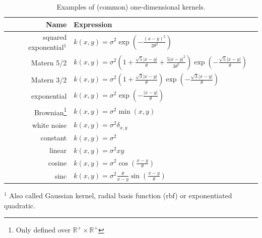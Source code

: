 \documentclass[twoside,openright]{report}
\begin{document}
\begin{table}[b]
\begin{center}
\begin{tabular}{|rlN|}
		\hline
		Name & Expression &\\[4mm]  \hline 
		squared exponential$^1$ & $\displaystyle k(x,y) = \sigma^2 \exp \left(- \frac{(x-y)^2}{2 \theta^2} \right)$ &\\[6mm]
		Matern 5/2 & $\displaystyle k(x,y) = \sigma^2 \left(1 + \frac{\sqrt{5}|x-y|}{\theta} + \frac{5|x-y|^2}{3 \theta^2} \right) \exp \left(- \frac{\sqrt{5}|x-y|}{\theta} \right)$ &\\[6mm]
		Matern 3/2 & $\displaystyle k(x,y) = \sigma^2 \left(1 + \frac{\sqrt{3}|x-y|}{\theta} \right) \exp \left(- \frac{\sqrt{3}|x-y|}{\theta} \right)$ &\\[6mm]
		exponential & $\displaystyle k(x,y) = \sigma^2 \exp \left(- \frac{|x-y|}{\theta} \right)$ &\\[6mm]
		Brownian\footnote{Only defined over $\mathds{R}^{+} \times \mathds{R}^+$} & $ \displaystyle k(x,y) = \sigma^2 \min (x,y) $ &\\[6mm]
		white noise & $ \displaystyle k(x,y) = \sigma^2 \delta_{x,y} $ &\\[6mm]
		constant & $ \displaystyle k(x,y) = \sigma^2 $ &\\[6mm]
		linear & $ \displaystyle k(x,y) = \sigma^2 xy $ &\\[6mm]
		cosine & $ \displaystyle k(x,y) = \sigma^2 \cos \left (\frac{x-y}{\theta} \right) $ &\\[6mm]
		sinc & $ \displaystyle k(x,y) = \sigma^2 \frac{\theta}{x-y} \sin \left( \frac{x-y}{\theta} \right) $ &\\[6mm] \hline
\end{tabular}
\end{center}
\hspace{1cm} \footnotesize{$^1$ Also called Gaussian kernel, radial basis function (rbf) or exponentiated quadratic.}
\caption{Examples of (common) one-dimensional kernels.}
\label{tab:ker1d}
\end{table}
\end{document}
